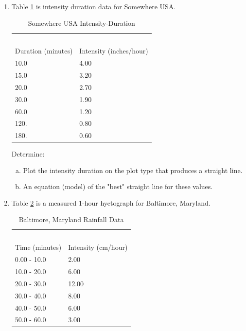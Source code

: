 \documentclass[12pt]{article}
\begin{document}
\begin{enumerate}
\clearpage


\item Table \ref{tab:SomewhereUSARainIDF} is intensity duration data for Somewhere USA.

\begin{table}[h!]
\centering
\caption{Somewhere USA Intensity-Duration}
\begin{tabular}{p{2.0in}p{2.0in}} %
~&~\\
Duration (minutes) & Intensity (inches/hour) \\
\hline
\hline
10.0 & 4.00 \\
15.0 & 3.20 \\
20.0 & 2.70 \\
30.0 & 1.90 \\
60.0 & 1.20 \\
120. & 0.80 \\
180. & 0.60 \\
\hline
\end{tabular}
\label{tab:SomewhereUSARainIDF}
\end{table}

Determine:
    \begin{enumerate}[a)]
        \item Plot the intensity duration on the plot type that produces a straight line.
        \item An equation (model) of the "best" straight line for these values. 
    \end{enumerate}

\clearpage

\item Table \ref{tab:Baltimore} is a measured 1-hour hyetograph for Baltimore, Maryland.

\begin{table}[h!]
\centering
\caption{Baltimore, Maryland Rainfall Data}
\begin{tabular}{p{2.0in}p{2.0in}} %
~&~\\
Time (minutes) & Intensity (cm/hour) \\
\hline
\hline
0.00 - 10.0 & 2.00 \\
10.0 - 20.0 & 6.00 \\
20.0 - 30.0 & 12.00 \\
30.0 - 40.0 & 8.00 \\
40.0 - 50.0 & 6.00 \\
50.0 - 60.0 & 3.00 \\
\hline
\end{tabular}
\label{tab:Baltimore}
\end{table}


\end{enumerate}
\end{document}
